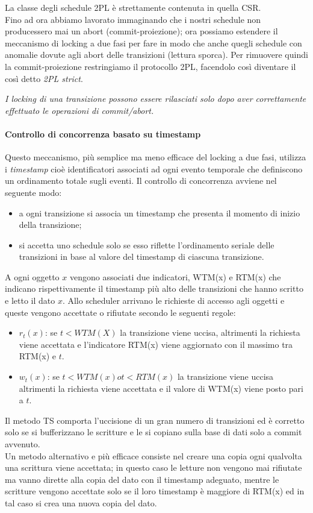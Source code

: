 La classe degli schedule 2PL è strettamente contenuta in quella CSR.\\
Fino ad ora abbiamo lavorato immaginando che i nostri schedule non producessero mai un abort (commit-proiezione); ora possiamo estendere il meccanismo di locking a due fasi per fare in modo che anche quegli schedule con anomalie dovute agli abort delle transizioni (lettura sporca). Per rimuovere quindi la commit-proiezione restringiamo il protocollo 2PL, facendolo così diventare il così detto \emph{2PL strict}.\\
\begin{center}
\emph{I locking di una transizione possono essere rilasciati solo dopo aver correttamente effettuato le operazioni di commit/abort.}\\
\end{center}
\paragraph{Controllo di concorrenza basato su timestamp} Questo meccanismo, più semplice ma meno efficace del locking a due fasi, utilizza i \emph{timestamp} cioè identificatori associati ad ogni evento temporale che definiscono un ordinamento totale sugli eventi. Il controllo di concorrenza avviene nel seguente modo:
\begin{itemize}
\item a ogni transizione si associa un timestamp che presenta il momento di inizio della transizione;
\item si accetta uno schedule solo se esso riflette l'ordinamento seriale delle transizioni in base al valore del timestamp di ciascuna transizione.
\end{itemize}
A ogni oggetto $x$ vengono associati due indicatori, WTM(x) e RTM(x) che indicano rispettivamente il timestamp più alto delle transizioni che hanno scritto e letto il dato $x$. Allo scheduler arrivano le richieste di accesso agli oggetti e queste vengono accettate o rifiutate secondo le seguenti regole:
\begin{itemize}
\item $r_t(x)$: se $t < WTM(X)$ la transizione viene uccisa, altrimenti la richiesta viene accettata e l'indicatore RTM(x) viene aggiornato con il massimo tra RTM(x) e $t$.
\item $w_t(x)$: se $t < WTM(x) o t < RTM(x)$ la transizione viene uccisa altrimenti la richiesta viene accettata e il valore di WTM(x) viene posto pari a $t$.
\end{itemize}
Il metodo TS comporta l'uccisione di un gran numero di transizioni ed è corretto solo se si bufferizzano le scritture e le si copiano sulla base di dati solo a commit avvenuto.\\
Un metodo alternativo e più efficace consiste nel creare una copia ogni qualvolta una scrittura viene accettata; in questo caso le letture non vengono mai rifiutate ma vanno dirette alla copia del dato con il timestamp adeguato, mentre le scritture vengono accettate solo se il loro timestamp è maggiore di RTM(x) ed in tal caso si crea una nuova copia del dato.\\
